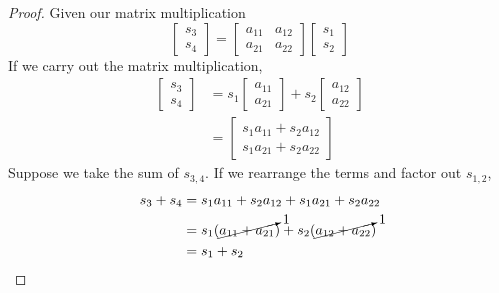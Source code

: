\documentclass[]{article}
\numberwithin{equation}{section}
\begin{document}
\begin{proof}
Given our matrix multiplication
\begin{equation}
	\begin{bmatrix}
	s_3 \\
	s_4
	\end{bmatrix}
	=
	\begin{bmatrix}
	a_{11} & a_{12} \\
	a_{21} & a_{22}
	\end{bmatrix}
	\begin{bmatrix}
	s_1 \\
	s_2
	\end{bmatrix}
\end{equation}
If we carry out the matrix multiplication,
\begin{align}
	\begin{bmatrix}
	s_3 \\
	s_4
	\end{bmatrix}
	&=
	s_1 \begin{bmatrix}
	a_{11} \\
	a_{21}
	\end{bmatrix} + 
	s_2 \begin{bmatrix}
	a_{12} \\
	a_{22}
	\end{bmatrix} \\
	&= 
	\begin{bmatrix}
	s_1 a_{11} + s_2 a_{12} \\
	s_1 a_{21} + s_2 a_{22}
	\end{bmatrix}
\end{align}
Suppose we take the sum of \(s_{3,4}\). If we rearrange the terms and factor out \(s_{1,2}\),
\begin{align}
	s_3 + s_4 &= s_1 a_{11} + s_2 a_{12} + s_1 a_{21} + s_2 a_{22} \\
	&= s_1 (\cancelto{1}{a_{11} + a_{21}}) + s_2 (\cancelto{1}{a_{12} + a_{22}}) \\
	&= s_1 + s_2
\end{align}
\end{proof}

\subsection{}
\end{document}
